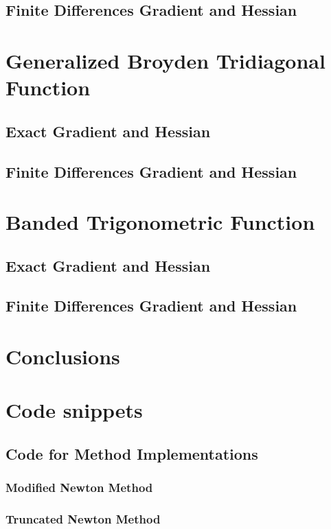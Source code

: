 \documentclass[a4paper,12pt]{article}
\begin{document}
	\subsection{Finite Differences Gradient and Hessian}
	
	\section{Generalized Broyden Tridiagonal Function}
	\subsection{Exact Gradient and Hessian}
	\subsection{Finite Differences Gradient and Hessian}
	
	\section{Banded Trigonometric Function}
	\subsection{Exact Gradient and Hessian}
	\subsection{Finite Differences Gradient and Hessian}
	
	\section{Conclusions}
	
	\appendix              %
	\section{Code snippets}
	\subsection{Code for Method Implementations}
	\subsubsection{Modified Newton Method}
	\subsubsection{Truncated Newton Method}
\end{document}
